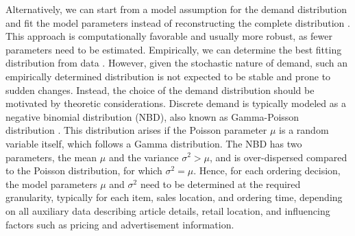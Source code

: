 \documentclass[BCOR=1mm, DIV=calc,10pt,
twoside=true,
twocolumn,
headings=normal]{scrartcl}
\begin{document}
Alternatively, we can start from a model assumption for the demand distribution and fit the model parameters instead of reconstructing the complete distribution \cite{astonpr373, SALINAS20201181}. This approach is computationally favorable and usually more robust, as fewer parameters need to be estimated. Empirically, we can determine the best fitting distribution from data \cite{adan1995}. However, given the stochastic nature of demand, such an empirically determined distribution is not expected to be stable and prone to sudden changes. Instead, the choice of the demand distribution should be motivated by theoretic considerations. Discrete demand is typically modeled as a negative binomial distribution (NBD), also known as Gamma-Poisson distribution \cite{Ehrenberg1959, Ehrenberg1967, Ehrenberg1972, Chatfield1973, Schmittlein_1985}. This distribution arises if the Poisson parameter $\mu$ is a random variable itself, which follows a Gamma distribution. The NBD has two parameters, the mean $\mu$ and the variance $ \sigma^2 > \mu$, and is over-dispersed compared to the Poisson distribution, for which $\sigma^2 = \mu$. Hence, for each ordering decision, the model parameters $\mu$ and $\sigma^2$ need to be determined at the required granularity, typically for each item, sales location, and ordering time, depending on all auxiliary data describing article details, retail location, and influencing factors such as pricing and advertisement information.
\end{document}
